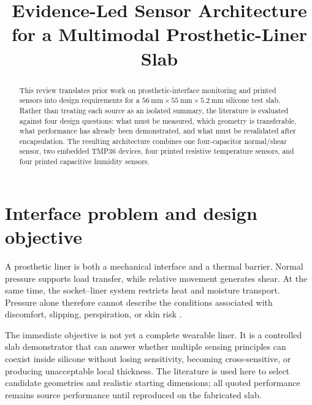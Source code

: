 \documentclass[10pt,twocolumn]{article}
\title{\vspace{-1.2em}\textbf{Evidence-Led Sensor Architecture for a
Multimodal Prosthetic-Liner Slab}}
\author{}
\date{}
\begin{document}
\maketitle
\vspace{-2.2em}

\begin{abstract}
\noindent
This review translates prior work on prosthetic-interface monitoring and
printed sensors into design requirements for a
\(\SI{56}{\milli\metre}\times\SI{55}{\milli\metre}\times\SI{5.2}{\milli\metre}\) silicone test slab. Rather than treating each
source as an isolated summary, the literature is evaluated against four design
questions: what must be measured, which geometry is transferable, what
performance has already been demonstrated, and what must be revalidated after
encapsulation. The resulting architecture combines one four-capacitor
normal/shear sensor, two embedded TMP36 devices, four printed resistive
temperature sensors, and four printed capacitive humidity sensors.
\end{abstract}

\section{Interface problem and design objective}

A prosthetic liner is both a mechanical interface and a thermal barrier.
Normal pressure supports load transfer, while relative movement generates
shear. At the same time, the socket--liner system restricts heat and moisture
transport. Pressure alone therefore cannot describe the conditions associated
with discomfort, slipping, perspiration, or skin risk
\cite{alfakih2016,klute2007,paterno2020}.

The immediate objective is not yet a complete wearable liner. It is a
controlled slab demonstrator that can answer whether multiple sensing
principles can coexist inside silicone without losing sensitivity, becoming
cross-sensitive, or producing unacceptable local thickness. The literature is
used here to select candidate geometries and realistic starting dimensions;
all quoted performance remains source performance until reproduced on the
fabricated slab.
\end{document}
